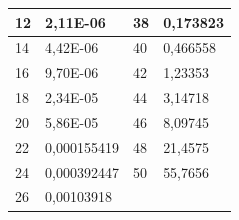 \documentclass[11pt]{article}
\begin{document}
\begin{figure}[H]
\begin{minipage}{0.5\textwidth}
\begin{tabular}{|l|l|l|l|}
        12 & 2,11E-06 & 38 & 0,173823 \\ \hline
        14 & 4,42E-06 & 40 & 0,466558 \\ \hline
        16 & 9,70E-06 & 42 & 1,23353 \\ \hline
        18 & 2,34E-05 & 44 & 3,14718 \\ \hline
        20 & 5,86E-05 & 46 & 8,09745 \\ \hline
        22 & 0,000155419 & 48 & 21,4575 \\ \hline
        24 & 0,000392447 & 50 & 55,7656 \\ \hline
        26 & 0,00103918 & ~ & \\ \hline
        \end{tabular}
    \end{minipage}
\end{figure}
\end{document}
